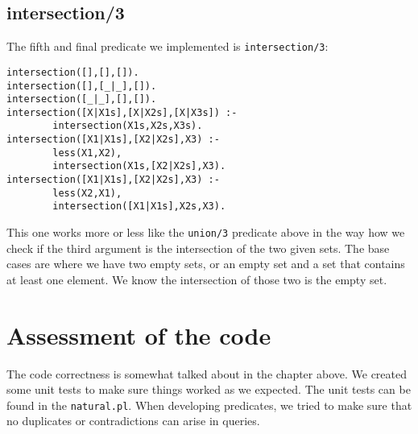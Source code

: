 \documentclass[a4paper,10pt]{article}
\begin{document}
\subsection{intersection/3}
The fifth and final predicate we implemented is \verb=intersection/3=:
\begin{verbatim}
intersection([],[],[]).
intersection([],[_|_],[]).
intersection([_|_],[],[]).
intersection([X|X1s],[X|X2s],[X|X3s]) :-
        intersection(X1s,X2s,X3s).
intersection([X1|X1s],[X2|X2s],X3) :-
        less(X1,X2),
        intersection(X1s,[X2|X2s],X3).
intersection([X1|X1s],[X2|X2s],X3) :-
        less(X2,X1),
        intersection([X1|X1s],X2s,X3).
\end{verbatim}
This one works more or less like the \verb=union/3= predicate above in the way how we check if the third argument is the intersection of the two given sets. The base cases are where we have two empty sets, or an empty set and a set that contains at least one element. We know the intersection of those two is the empty set.

\section{Assessment of the code}

The code correctness is somewhat talked about in the chapter above. We created some unit tests to make sure things worked as we expected. The unit tests can be found in the \verb=natural.pl=. When developing predicates, we tried to make sure that no duplicates or contradictions can arise in queries. 
\end{document}
